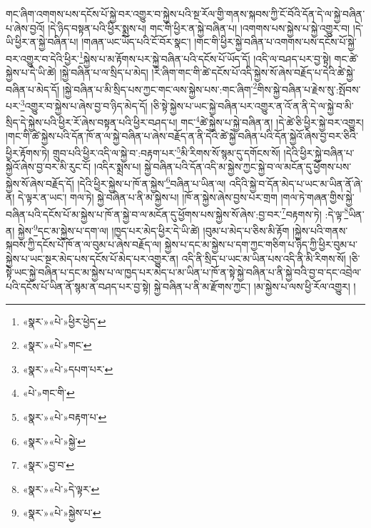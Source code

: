 གང་ཞིག་འགགས་པས་དངོས་པོ་སྐྱེ་བར་འགྱུར་བ་སྐྱེས་པའི་སྔ་རོལ་གྱི་གནས་སྐབས་ཀྱི་ངོ་བོའི་དོན་དེ་ལ་སྐྱེ་བཞིན་པ་ཞེས་བྱའོ། །དེ་ཉིད་བསྟན་པའི་ཕྱིར་སྨྲས་པ། གང་གི་ཕྱིར་ན་སྐྱེ་བཞིན་པ། །འགགས་པས་སྐྱེས་པ་སྐྱེ་འགྱུར་བ། །དེ་ཡི་ཕྱིར་ན་སྐྱེ་བཞིན་པ། །གཞན་ཡང་ཡོད་པའི་ངོ་བོར་སྣང་། །གང་གི་ཕྱིར་སྐྱེ་བཞིན་པ་འགགས་པས་དངོས་པོ་སྐྱེ་བར་འགྱུར་བ་དེའི་ཕྱིར་\footnote{«སྣར་»«པེ་»ཕྱིར་ཕྱེད་}སྐྱེས་པ་མ་རྟོགས་པར་སྐྱེ་བཞིན་པའི་དངོས་པོ་ཡོད་དོ། །འདི་ལ་བཤད་པར་བྱ་སྟེ། གང་ཚེ་སྐྱེས་པ་དེ་ཡི་ཚེ། །སྐྱེ་བཞིན་པ་ལ་སྲིད་པ་མེད། །རེ་ཞིག་གང་གི་ཚེ་དངོས་པོ་འདི་སྐྱེས་སོ་ཞེས་བརྗོད་པ་དེའི་ཚེ་སྐྱེ་བཞིན་པ་མེད་དོ། །སྐྱེ་བཞིན་པ་མི་སྲིད་པས་ཀྱང་གང་ལས་སྐྱེས་པས་:གང་ཞིག་\footnote{«སྣར་»«པེ་»གང་}གིས་སྐྱེ་བཞིན་པ་རྗེས་སུ་:སྤོབས་པར་\footnote{«སྣར་»«པེ་»དཔག་པར་}འགྱུར་བ་སྐྱེས་པ་ཞེས་བྱ་བ་ཉིད་མེད་དོ། །ཅི་སྟེ་སྐྱེས་པ་ཡང་སྐྱེ་བཞིན་པར་འགྱུར་ན་འོ་ན་ནི་དེ་ལ་སྐྱེ་བ་མི་སྲིད་དེ་སྐྱེས་པའི་ཕྱིར་རོ་ཞེས་བསྟན་པའི་ཕྱིར་བཤད་པ། གང་\footnote{«པེ་»གང་གི་}ཚེ་སྐྱེས་པ་སྐྱེ་བཞིན་ན། །དེ་ཚེ་ཅི་ཕྱིར་སྐྱེ་བར་འགྱུར། །གང་གི་ཚེ་སྐྱེས་པའི་དོན་ཁོ་ན་ལ་སྐྱེ་བཞིན་པ་ཞེས་བརྗོད་ན་ནི་དེའི་ཚེ་སྐྱེ་བཞིན་པའི་དོན་སྐྱེའོ་ཞེས་བྱ་བར་ཅིའི་ཕྱིར་རྟོགས་ཏེ། གྲུབ་པའི་ཕྱིར་འདི་ལ་སྐྱེ་བ་:བརྟག་པར་\footnote{«སྣར་»«པེ་»བརྟག་པ་}མི་རིགས་སོ་སྙམ་དུ་དགོངས་སོ། །དེའི་ཕྱིར་སྐྱེ་བཞིན་པ་སྐྱེའོ་ཞེས་བྱ་བར་མི་རུང་ངོ། །འདིར་སྨྲས་པ། སྐྱེ་བཞིན་པའི་དོན་འདི་མ་སྐྱེས་ཀྱང་སྐྱེ་བ་ལ་མངོན་དུ་ཕྱོགས་པས་སྐྱེས་སོ་ཞེས་བརྗོད་དོ། །དེའི་ཕྱིར་སྐྱེས་པ་ཁོ་ན་སྐྱེས་\footnote{«སྣར་»«པེ་»སྐྱེ་}བཞིན་པ་ཡིན་ལ། འདིའི་སྐྱེ་བ་དོན་མེད་པ་ཡང་མ་ཡིན་ནོ་ཞེ་ན། དེ་ལྟར་ན་ཡང་། གལ་ཏེ། སྐྱེ་བཞིན་པ་ནི་མ་སྐྱེས་པ། །ཁོ་ན་སྐྱེས་ཞེས་བྱས་པར་གྲག །གལ་ཏེ་གཞན་གྱིས་སྐྱེ་བཞིན་པའི་དངོས་པོ་མ་སྐྱེས་པ་ཁོ་ན་སྐྱེ་བ་ལ་མངོན་དུ་ཕྱོགས་པས་སྐྱེས་སོ་ཞེས་:བྱ་བར་\footnote{«སྣར་»བྱ་བ་}བརྟགས་ཏེ། :དེ་ལྟ་\footnote{«སྣར་»«པེ་»དེ་ལྟར་}ཡིན་ན། སྐྱེས་\footnote{«སྣར་»«པེ་»སྐྱེས་པ་}དང་མ་སྐྱེས་པ་དག་ལ། །ཁྱད་པར་མེད་ཕྱིར་དེ་ཡི་ཚེ། །བུམ་པ་མེད་པ་ཅིས་མི་རྟོག །སྐྱེས་པའི་གནས་སྐབས་ཀྱི་དངོས་པོ་ཁོ་ན་ལ་བུམ་པ་ཞེས་བརྗོད་ལ། སྐྱེས་པ་དང་མ་སྐྱེས་པ་དག་ཀྱང་གཅིག་པ་ཉིད་ཀྱི་ཕྱིར་བུམ་པ་སྐྱེས་པ་ཡང་སྔར་མེད་པས་དངོས་པོ་མེད་པར་འགྱུར་ན། འདི་ནི་སྲིད་པ་ཡང་མ་ཡིན་པས་འདི་ནི་མི་རིགས་སོ། །ཅི་སྟེ་ཡང་སྐྱེ་བཞིན་པ་དང་མ་སྐྱེས་པ་ལ་ཁྱད་པར་མེད་པ་མ་ཡིན་པ་ཁོ་ན་སྟེ་སྐྱེ་བཞིན་པ་ནི་སྐྱེ་བའི་བྱ་བ་དང་འབྲེལ་པའི་དངོས་པོ་ཡིན་ནོ་སྙམ་ན་བཤད་པར་བྱ་སྟེ། སྐྱེ་བཞིན་པ་ནི་མ་རྫོགས་ཀྱང་། །མ་སྐྱེས་པ་ལས་ཕྱི་རོལ་འགྱུར། །
